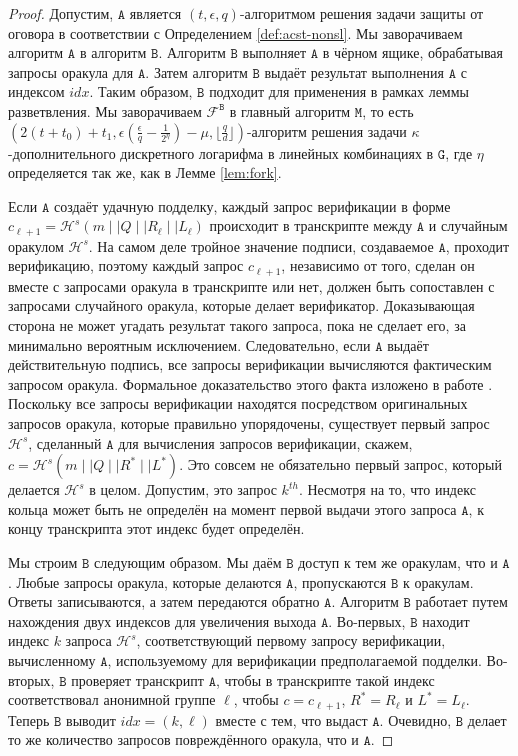 \documentclass{llncs}
\newcommand{\A}{\texttt{A}}
\newcommand{\B}{\texttt{B}}
\newcommand{\G}{\texttt{G}}
\newcommand{\Hs}{\mathcal{H}^s}
\begin{document}
\begin{proof}
Допустим, $\A$ является $(t, \epsilon, q)$-алгоритмом решения задачи защиты от оговора в соответствии с Определением \ref{def:acst-nonsl}. Мы заворачиваем алгоритм $\A$ в алгоритм $\B$. Алгоритм $\B$ выполняет $\A$ в чёрном ящике, обрабатывая запросы оракула для $\A$. Затем алгоритм $\B$ выдаёт результат выполнения $\A$ с индексом $idx$. Таким образом, $\B$ подходит для применения в рамках леммы разветвления. Мы заворачиваем $\mathcal{F}^{\B}$ в главный алгоритм $\texttt{M}$, то есть $(2(t+t_0) + t_1, \epsilon\left(\frac{\epsilon}{q} - \frac{1}{2^\eta}\right) - \mu, \lfloor \frac{q}{d}\rfloor)$-алгоритм решения задачи $\kappa$-дополнительного дискретного логарифма в линейных комбинациях в $\G$, где $\eta$ определяется так же, как в Лемме \ref{lem:fork}.

Если $\A$ создаёт удачную подделку, каждый запрос верификации в форме $c_{\ell+1} = \Hs(m \mid \mid Q \mid \mid R_\ell \mid \mid L_\ell)$ происходит в транскрипте между $\A$ и случайным оракулом $\Hs$. На самом деле тройное значение подписи, создаваемое $\A$, проходит верификацию, поэтому каждый запрос $c_{\ell+1}$, независимо от того, сделан он вместе с запросами оракула в транскрипте или нет, должен быть сопоставлен с запросами случайного оракула, которые делает верификатор. Доказывающая сторона не может угадать результат такого запроса, пока не сделает его, за минимально вероятным исключением. Следовательно, если $\A$ выдаёт действительную подпись, все запросы верификации вычисляются фактическим запросом оракула. Формальное доказательство этого факта изложено в работе \cite{liu2004linkable}. Поскольку все запросы верификации находятся посредством оригинальных запросов оракула, которые правильно упорядочены, существует первый запрос $\Hs$, сделанный $\A$ для вычисления запросов верификации, скажем, $c = \Hs(m \mid \mid Q \mid \mid R^* \mid \mid L^*)$. Это совсем не обязательно первый запрос, который делается $\Hs$ в целом. Допустим, это запрос $k^{th}$. Несмотря на то, что индекс кольца может быть не определён на момент первой выдачи этого запроса $\A$, к концу транскрипта этот индекс будет определён.

Мы строим $\B$ следующим образом. Мы даём $\B$ доступ к тем же оракулам, что и $\A$. Любые запросы оракула, которые делаются $\A$, пропускаются $\B$ к оракулам. Ответы записываются, а затем передаются обратно $\A$. Алгоритм $\B$ работает путем нахождения двух индексов для увеличения выхода $\A$. Во-первых, $\B$ находит индекс $k$ запроса $\Hs$, соответствующий первому запросу верификации, вычисленному $\A$, используемому для верификации предполагаемой подделки. Во-вторых, $\B$ проверяет транскрипт $\A$, чтобы в транскрипте такой индекс соответствовал анонимной группе $\ell$, чтобы $c = c_{\ell+1}$, $R^* = R_\ell$ и $L^* = L_\ell$. Теперь $\B$ выводит $idx = (k, \ell)$ вместе с тем, что выдаст $\A$. Очевидно, $\B$ делает то же количество запросов повреждённого оракула, что и $\A$.


\end{proof}
\end{document}
